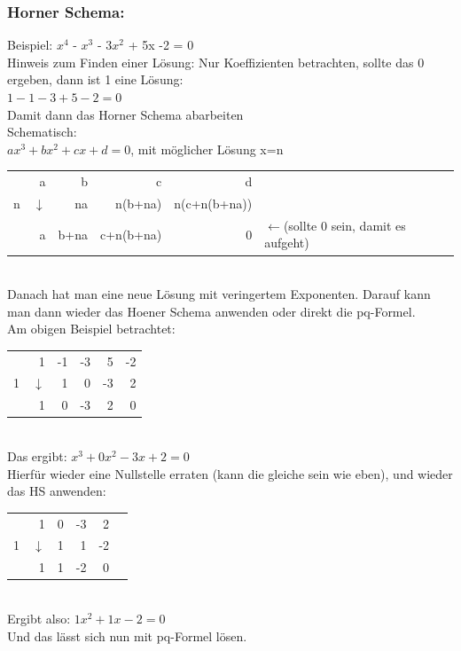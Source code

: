 \documentclass[6pt,a4paper]{scrartcl}
\begin{document}
\begin{multicols*}{2}
\subsubsection{Horner Schema:}
Beispiel: $x^4$ - $x^3$ - $3x^2$ + 5x -2 = 0\\
Hinweis zum Finden einer Lösung: Nur Koeffizienten betrachten, sollte das 0 ergeben, dann ist 1 eine Lösung:\\
$1 - 1 -3 + 5 - 2 = 0$\\
Damit dann das Horner Schema abarbeiten\\
Schematisch:\\
$ax^3 + bx^2 + cx + d = 0$, mit möglicher Lösung x=n\\
\begin{tabular}{r|rrrrl}
	& a 				& b 		& c 			& d &\\
n 	& $\downarrow$	& na 	& n(b+na) 	& n(c+n(b+na)) &\\
\hline
 	& a 				& b+na 	& c+n(b+na) 	& 0 & $\leftarrow$(sollte 0 sein, damit es aufgeht)\\
\end{tabular}\\
Danach hat man eine neue Lösung mit veringertem Exponenten. Darauf kann man dann wieder das Hoener Schema anwenden oder direkt die pq-Formel.\\
Am obigen Beispiel betrachtet:\\
\begin{tabular}{r|rrrrr}
	& 1 				& -1 & -3 & 5  & -2\\
1 	& $\downarrow$	& 1 	 & 0  & -3 & 2\\
\hline
 	& 1 				& 0 	 & -3 & 2 & 0\\
\end{tabular}\\
Das ergibt: $x^3 + 0x^2 -3x +2 = 0$\\
Hierfür wieder eine Nullstelle erraten (kann die gleiche sein wie eben), und wieder das HS anwenden:\\
\begin{tabular}{r|rrrrr}
	& 1 				& 0 & -3 & 2\\
1 	& $\downarrow$	& 1 	& 1  & -2\\
\hline
 	& 1 				& 1 	& -2 & 0\\
\end{tabular}\\
Ergibt also: $1x^2 + 1x -2 = 0$\\
Und das lässt sich nun mit pq-Formel lösen.\\


\end{multicols*}
\end{document}
